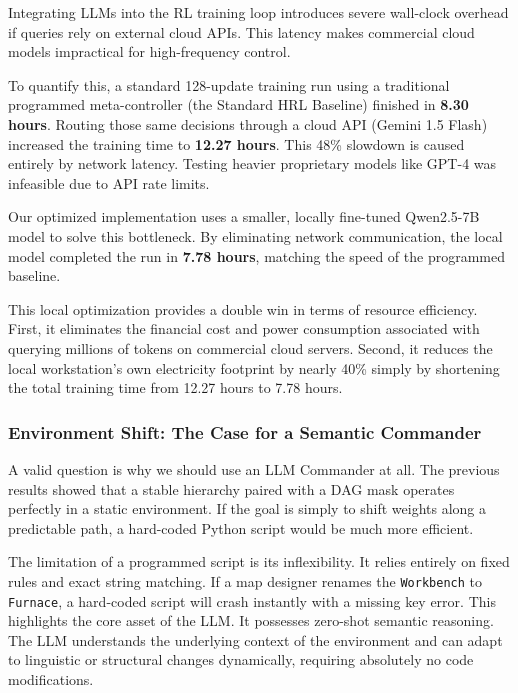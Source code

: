 Integrating LLMs into the RL training loop introduces severe wall-clock overhead if queries rely on external cloud APIs. This latency makes commercial cloud models impractical for high-frequency control. 

To quantify this, a standard 128-update training run using a traditional programmed meta-controller (the Standard HRL Baseline) finished in \textbf{8.30 hours}. Routing those same decisions through a cloud API (Gemini 1.5 Flash) increased the training time to \textbf{12.27 hours}. This 48\% slowdown is caused entirely by network latency. Testing heavier proprietary models like GPT-4 was infeasible due to API rate limits.

Our optimized implementation uses a smaller, locally fine-tuned Qwen2.5-7B model to solve this bottleneck. By eliminating network communication, the local model completed the run in \textbf{7.78 hours}, matching the speed of the programmed baseline. 

This local optimization provides a double win in terms of resource efficiency. First, it eliminates the financial cost and power consumption associated with querying millions of tokens on commercial cloud servers. Second, it reduces the local workstation's own electricity footprint by nearly 40\% simply by shortening the total training time from 12.27 hours to 7.78 hours.

\subsubsection{Environment Shift: The Case for a Semantic Commander}
\label{sec:semantic_adaptation}

A valid question is why we should use an LLM Commander at all. The previous results showed that a stable hierarchy paired with a DAG mask operates perfectly in a static environment. If the goal is simply to shift weights along a predictable path, a hard-coded Python script would be much more efficient.

The limitation of a programmed script is its inflexibility. It relies entirely on fixed rules and exact string matching. If a map designer renames the \texttt{Workbench} to \texttt{Furnace}, a hard-coded script will crash instantly with a missing key error. This highlights the core asset of the LLM. It possesses zero-shot semantic reasoning. The LLM understands the underlying context of the environment and can adapt to linguistic or structural changes dynamically, requiring absolutely no code modifications.

